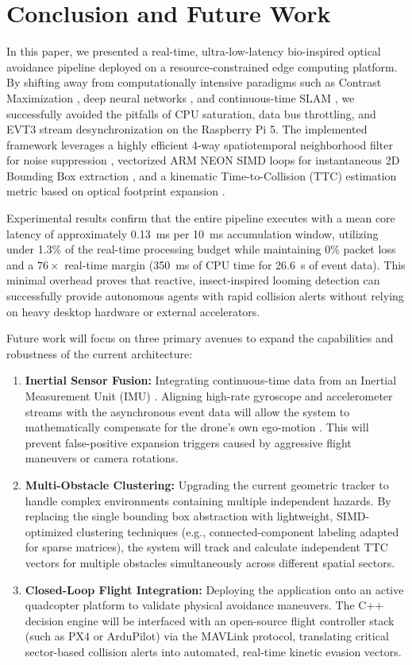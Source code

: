 \documentclass[conference]{IEEEtran}
\begin{document}
\section{Conclusion and Future Work}

In this paper, we presented a real-time, ultra-low-latency bio-inspired optical avoidance pipeline deployed on a resource-constrained edge computing platform. By shifting away from computationally intensive paradigms such as Contrast Maximization \cite{b6}, deep neural networks \cite{b5, b11}, and continuous-time SLAM \cite{b10}, we successfully avoided the pitfalls of CPU saturation, data bus throttling, and EVT3 stream desynchronization on the Raspberry Pi 5. The implemented framework leverages a highly efficient 4-way spatiotemporal neighborhood filter for noise suppression \cite{b15}, vectorized ARM NEON SIMD loops for instantaneous 2D Bounding Box extraction \cite{b14}, and a kinematic Time-to-Collision (TTC) estimation metric based on optical footprint expansion \cite{b13}. 

Experimental results confirm that the entire pipeline executes with a mean core latency of approximately 0.13~ms per 10~ms accumulation window, utilizing under 1.3\% of the real-time processing budget while maintaining 0\% packet loss and a $76\times$ real-time margin (350~ms of CPU time for 26.6~s of event data). This minimal overhead proves that reactive, insect-inspired looming detection \cite{b13} can successfully provide autonomous agents with rapid collision alerts without relying on heavy desktop hardware or external accelerators.

Future work will focus on three primary avenues to expand the capabilities and robustness of the current architecture:
\begin{enumerate}
    \item \textbf{Inertial Sensor Fusion:} Integrating continuous-time data from an Inertial Measurement Unit (IMU) \cite{b10}. Aligning high-rate gyroscope and accelerometer streams with the asynchronous event data will allow the system to mathematically compensate for the drone's own ego-motion \cite{b4}. This will prevent false-positive expansion triggers caused by aggressive flight maneuvers or camera rotations.
    \item \textbf{Multi-Obstacle Clustering:} Upgrading the current geometric tracker to handle complex environments containing multiple independent hazards. By replacing the single bounding box abstraction with lightweight, SIMD-optimized clustering techniques (e.g., connected-component labeling adapted for sparse matrices), the system will track and calculate independent TTC vectors for multiple obstacles simultaneously across different spatial sectors.
    \item \textbf{Closed-Loop Flight Integration:} Deploying the application onto an active quadcopter platform to validate physical avoidance maneuvers. The C++ decision engine will be interfaced with an open-source flight controller stack (such as PX4 or ArduPilot) via the MAVLink protocol, translating critical sector-based collision alerts into automated, real-time kinetic evasion vectors.
\end{enumerate}
\end{document}
